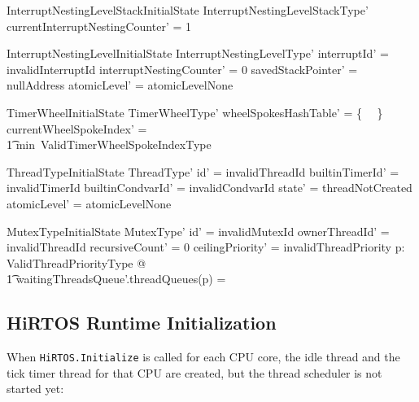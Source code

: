 \documentclass[11pt,letterpaper,twoside,openany]{book}
\begin{document}
\begin{schema}{InterruptNestingLevelStackInitialState}
   InterruptNestingLevelStackType'
\where
   currentInterruptNestingCounter' = 1 \\
\end{schema}

\begin{schema}{InterruptNestingLevelInitialState}
   InterruptNestingLevelType'
\where
   interruptId' = invalidInterruptId
\also
   interruptNestingCounter' = 0
\also
   savedStackPointer' = nullAddress
\also
   atomicLevel' = atomicLevelNone
\end{schema}

\begin{schema}{TimerWheelInitialState}
   TimerWheelType'
\where
   \ran wheelSpokesHashTable' = \{~ \emptyset ~\}
\also
   currentWheelSpokeIndex' = \\
   \t1 min~ValidTimerWheelSpokeIndexType
\end{schema}


\begin{schema}{ThreadTypeInitialState}
   ThreadType'
\where
   id' = invalidThreadId
\also
   builtinTimerId' = invalidTimerId
\also
   builtinCondvarId' = invalidCondvarId
\also
   state' = threadNotCreated
\also
   atomicLevel' = atomicLevelNone
\end{schema}


\begin{schema}{MutexTypeInitialState}
   MutexType'
\where
  id' = invalidMutexId
\also
  ownerThreadId' = invalidThreadId
\also
  recursiveCount' = 0
\also
  ceilingPriority' = invalidThreadPriority
\also
   \forall p: ValidThreadPriorityType @ \\
\t1      waitingThreadsQueue'.threadQueues(p) = \emptyset
\end{schema}

\subsection{HiRTOS Runtime Initialization}
When \verb`HiRTOS.Initialize` is called for each CPU core, the idle thread
and the tick timer thread for that CPU are created, but the thread
scheduler is not started yet:
\end{document}
